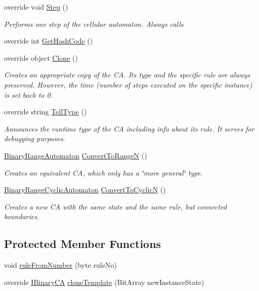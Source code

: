 \begin{DoxyCompactItemize}
override void \hyperlink{class_cellular_1_1_elementary_automaton_adae7c322e4c7cd00cd0534a23d1abfa4}{Step} ()
\begin{DoxyCompactList}\small\item\em Performs one step of the cellular automaton. Always calls \end{DoxyCompactList}\item 
override int \hyperlink{class_cellular_1_1_elementary_automaton_abaa1bb77264571ec245155f079fe1ff0}{Get\+Hash\+Code} ()
\item 
override object \hyperlink{class_cellular_1_1_elementary_automaton_ada4ddee98167e8f4f4b6dea1f7563b47}{Clone} ()
\begin{DoxyCompactList}\small\item\em Creates an appropriate copy of the C\+A. Its type and the specific rule are always preserved. However, the time (number of steps executed on the specific instance) is set back to 0. \end{DoxyCompactList}\item 
override string \hyperlink{class_cellular_1_1_elementary_automaton_a812677139d560e2c600226361b785995}{Tell\+Type} ()
\begin{DoxyCompactList}\small\item\em Announces the runtime type of the C\+A including info about its rule. It serves for debugging purposes. \end{DoxyCompactList}\item 
\hyperlink{class_cellular_1_1_binary_range_automaton}{Binary\+Range\+Automaton} \hyperlink{class_cellular_1_1_elementary_automaton_aef244148e0234495c1f0afaef7f22e28}{Convert\+To\+Range\+N} ()
\begin{DoxyCompactList}\small\item\em Creates an equivalent C\+A, which only has a \char`\"{}more general\char`\"{} type. \end{DoxyCompactList}\item 
\hyperlink{class_cellular_1_1_binary_range_cyclic_automaton}{Binary\+Range\+Cyclic\+Automaton} \hyperlink{class_cellular_1_1_elementary_automaton_a8876a09ba28af93b0e5163eef3cbe79e}{Convert\+To\+Cyclic\+N} ()
\begin{DoxyCompactList}\small\item\em Creates a new C\+A with the same state and the same rule, but connected boundaries. \end{DoxyCompactList}\end{DoxyCompactItemize}
\subsection*{Protected Member Functions}
\begin{DoxyCompactItemize}
\item 
void \hyperlink{class_cellular_1_1_elementary_automaton_ac5b75fb02cff4d4697e3e04cc9849154}{rule\+From\+Number} (byte rule\+No)
\item 
override \hyperlink{interface_cellular_1_1_i_binary_c_a}{I\+Binary\+C\+A} \hyperlink{class_cellular_1_1_elementary_automaton_ae2a263ffe6e021daff6a4a6c45555f6c}{clone\+Template} (Bit\+Array new\+Instance\+State)
\end{DoxyCompactItemize}
